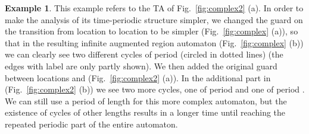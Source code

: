 \documentclass[11pt]{amsart}
\theoremstyle{definition}
\newtheorem{example}[theorem]{Example}
\begin{document}
\begin{example}
	This example refers to the TA of Fig.~\ref{fig:complex2} (a).
	In order to make the analysis of its time-periodic structure simpler, we changed the guard on the transition from location  to location  to be simpler (Fig.~\ref{fig:complex} (a)), so that in the resulting infinite augmented region automaton  (Fig.~\ref{fig:complex} (b)) we can clearly see two different cycles of period  (circled in dotted lines) (the edges with label  are only partly shown).
	We then added the original guard between locations  and  (Fig.~\ref{fig:complex2} (a)).
	In the additional part in  (Fig.~\ref{fig:complex2} (b)) we see two more cycles, one of period  and one of period .
	We can still use a period of length  for this more complex automaton, but the existence of cycles of other lengths results in a longer time until reaching the repeated periodic part of the entire automaton.
\begin{figure}[t]
\centering
\end{figure}
\end{example}
\end{document}
